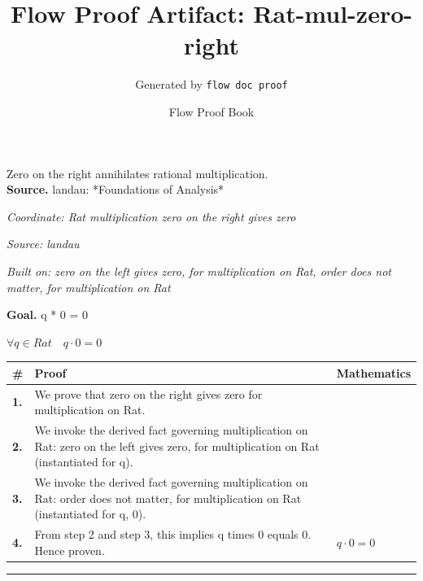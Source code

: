 \documentclass[11pt]{article}
\title{Flow Proof Artifact: Rat-mul-zero-right}
\author{Generated by \texttt{flow doc proof}}
\date{Flow Proof Book}
\theoremstyle{definition}
\begin{document}
\maketitle
Zero on the right annihilates rational multiplication.\\[0.5em]
\textbf{Source.} landau: *Foundations of Analysis*\\[0.5em]
\bigskip
{}\par
\smallskip\noindent\textit{Coordinate: Rat \cdot multiplication \cdot zero on the right gives zero}\par
\smallskip\noindent\textit{Source: landau}\par
\smallskip\noindent\textit{Built on: zero on the left gives zero, for multiplication on Rat, order does not matter, for multiplication on Rat}\par
\medskip
\noindent\textbf{Goal.} q * 0 = 0\par
\noindent$\displaystyle \forall q \in Rat\quad q \cdot 0 = 0$\par
\medskip
\noindent
\begin{tabular}{@{} >{\raggedright\arraybackslash}p{} >{\raggedright\arraybackslash}p{} >{\raggedleft\arraybackslash}p{} @{}}
\textbf{\#} & \textbf{Proof} & \textbf{Mathematics} \\
\midrule
\textbf{1.} & We prove that zero on the right gives zero for multiplication on Rat. & \\[0.45em]
\textbf{2.} & We invoke the derived fact governing multiplication on Rat: zero on the left gives zero, for multiplication on Rat (instantiated for q). & \\[0.45em]
\textbf{3.} & We invoke the derived fact governing multiplication on Rat: order does not matter, for multiplication on Rat (instantiated for q, 0). & \\[0.45em]
\textbf{4.} & From step 2 and step 3, this implies q times 0 equals 0. Hence proven. & $\displaystyle q \cdot 0 = 0$ \\[0.45em]
\bottomrule
\end{tabular}
\label{thm:Rat-multiplication-zero_on_the_right_gives_zero}
\par\medskip\hrule
\end{document}
